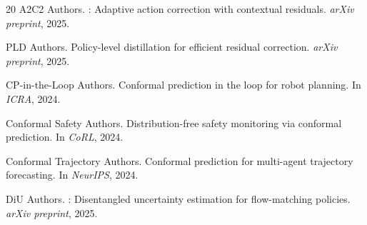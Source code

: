 \documentclass[10pt,letterpaper]{article}
\begin{document}
{\begin{thebibliography}{20}
{A2C2 Authors}.
: Adaptive action correction with contextual residuals.
\newblock \emph{arXiv preprint}, 2025.

{PLD Authors}.
\newblock Policy-level distillation for efficient residual correction.
\newblock \emph{arXiv preprint}, 2025.

{CP-in-the-Loop Authors}.
\newblock Conformal prediction in the loop for robot planning.
\newblock In \emph{ICRA}, 2024.

{Conformal Safety Authors}.
\newblock Distribution-free safety monitoring via conformal prediction.
\newblock In \emph{CoRL}, 2024.

{Conformal Trajectory Authors}.
\newblock Conformal prediction for multi-agent trajectory forecasting.
\newblock In \emph{NeurIPS}, 2024.

{DiU Authors}.
: Disentangled uncertainty estimation for flow-matching policies.
\newblock \emph{arXiv preprint}, 2025.

\end{thebibliography}
}
\end{document}
